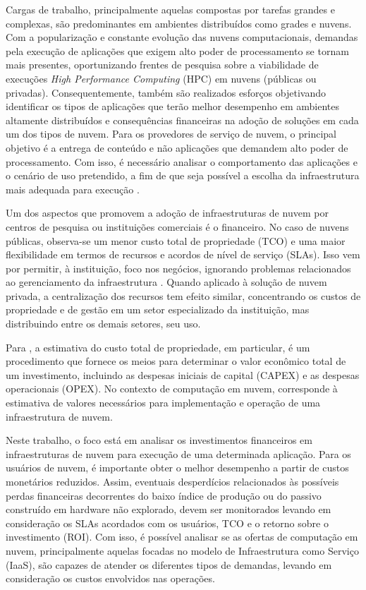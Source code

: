 \documentclass[tese,capa]{texufpel}
\begin{document}
Cargas de trabalho, principalmente aquelas compostas por tarefas grandes e complexas, são predominantes em ambientes distribuídos como grades e nuvens. Com a popularização e constante evolução das nuvens computacionais, demandas pela execução de aplicações que exigem alto poder de processamento se tornam mais presentes, oportunizando frentes de pesquisa sobre a viabilidade de execuções \textit{High Performance Computing} (HPC) em nuvens (públicas ou privadas). Consequentemente, também são realizados esforços objetivando identificar os tipos de aplicações que terão melhor desempenho em ambientes altamente distribuídos e consequências financeiras na adoção de soluções em cada um dos tipos de nuvem. Para os provedores de serviço de nuvem, o principal objetivo é a entrega de conteúdo e não aplicações que demandem alto poder de processamento. Com isso, é necessário analisar o comportamento das aplicações e o cenário de uso pretendido, a fim de que seja possível a escolha da infraestrutura mais adequada para execução \cite{roloffHighPerformanceComputing2012c}.

Um dos aspectos que promovem a adoção de infraestruturas de nuvem por centros de pesquisa ou instituições comerciais é o financeiro. No caso de nuvens públicas, observa-se um menor custo total de propriedade (TCO) e uma maior flexibilidade em termos de recursos e acordos de nível de serviço (SLAs). Isso vem por permitir, à instituição, foco nos negócios, ignorando problemas relacionados ao gerenciamento da infraestrutura \cite{aceto_cloud_2013}.
Quando aplicado à solução de nuvem privada, a centralização dos recursos tem efeito similar, concentrando os custos de propriedade e de gestão em um setor especializado da instituição, mas distribuindo entre os demais setores, seu uso.

Para \citet{filiopoulouIntegratingCostAnalysis2015}, a estimativa do custo total de propriedade, em particular, é um procedimento que fornece os meios para determinar o valor econômico total de um investimento, incluindo as despesas iniciais de capital (CAPEX) e as despesas operacionais (OPEX). No contexto de computação em nuvem, corresponde à estimativa de valores necessários para implementação e operação de uma infraestrutura de nuvem.

Neste trabalho, o foco está em analisar os investimentos financeiros em infraestruturas de nuvem para execução de uma determinada aplicação. Para os usuários de nuvem, é importante obter o melhor desempenho a partir de custos monetários reduzidos. Assim, eventuais desperdícios relacionados às possíveis perdas financeiras decorrentes do baixo índice de produção ou do passivo construído em hardware não explorado, devem ser monitorados levando em consideração os SLAs acordados com os usuários, TCO e o retorno sobre o investimento (ROI). Com isso, é possível analisar se as ofertas de computação em nuvem, principalmente aquelas focadas no modelo de Infraestrutura como Serviço (IaaS), são capazes de atender os diferentes tipos de demandas, levando em consideração os custos envolvidos nas operações.
\end{document}
